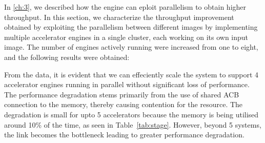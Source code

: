 \documentclass[a4paper,11pt, final]{report}
\begin{document}
In \ref{ch:3}, we described how the engine can eploit parallelism to obtain higher throughput. In this section, we characterize the throughput improvement obtained by exploiting the parallelism between different images by implementing multiple accelerator engines in a single cluster, each working on its own input image. The number of engines actively running were increased from one to eight, and the following results were obtained:
\\

From the data, it is evident that we can effeciently scale the system to support 4 accelerator engines running in parallel without significant loss of performance. The performance degradation stems primarily from the use of shared ACB connection to the memory, thereby causing contention for the resource. The degradation is small for upto 5 accelerators because the memory is being utilised around 10\% of the time, as seen in Table~\ref{tab:stage}. However, beyond 5 systems, the link becomes the bottleneck leading to greater performance degradation.
\\
\end{document}
